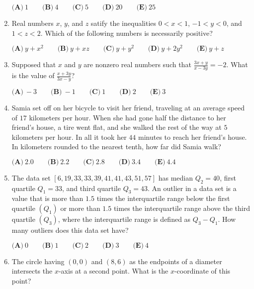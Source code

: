 \documentclass{article}
\begin{document}
\begin{enumerate}[label=\arabic*., itemsep=0.5em]
\(\textbf{(A)}\ 1\qquad\textbf{(B)}\ 4\qquad\textbf{(C)}\ 5\qquad\textbf{(D)}\ 20\qquad\textbf{(E)}\ 25\)\par \vspace{0.5em}\item Real numbers \(x\), \(y\), and \(z\) satify the inequalities
\(0<x<1\), \(-1<y<0\), and \(1<z<2\).
Which of the following numbers is necessarily positive?

\(\textbf{(A)}\ y+x^2\qquad\textbf{(B)}\ y+xz\qquad\textbf{(C)}\ y+y^2\qquad\textbf{(D)}\ y+2y^2\qquad\textbf{(E)}\ y+z\)\par \vspace{0.5em}\item Supposed that \(x\) and \(y\) are nonzero real numbers such that \(\frac{3x+y}{x-3y}=-2\). What is the value of \(\frac{x+3y}{3x-y}\)?

\(\textbf{(A)}\ -3\qquad\textbf{(B)}\ -1\qquad\textbf{(C)}\ 1\qquad\textbf{(D)}\ 2\qquad\textbf{(E)}\ 3\)\par \vspace{0.5em}\item Samia set off on her bicycle to visit her friend, traveling at an average speed of \(17\) kilometers per hour. When she had gone half the distance to her friend's house, a tire went flat, and she walked the rest of the way at \(5\) kilometers per hour. In all it took her \(44\) minutes to reach her friend's house. In kilometers rounded to the nearest tenth, how far did Samia walk?

\(\textbf{(A)}\ 2.0\qquad\textbf{(B)}\ 2.2\qquad\textbf{(C)}\ 2.8\qquad\textbf{(D)}\ 3.4\qquad\textbf{(E)}\ 4.4\)\par \vspace{0.5em}\item The data set \([6,19,33,33,39,41,41,43,51,57]\) has median \(Q_2 = 40\), first quartile \(Q_1 = 33\), and third quartile \(Q_3=43\). An outlier in a data set is a value that is more than \(1.5\) times the interquartile range below the first quartile \((Q_1)\) or more than \(1.5\) times the interquartile range above the third quartile \((Q_3)\), where the interquartile range is defined as \(Q_3 - Q_1\). How many outliers does this data set have?

\(\textbf{(A)}\ 0\qquad\textbf{(B)}\ 1\qquad\textbf{(C)}\ 2\qquad\textbf{(D)}\ 3\qquad\textbf{(E)}\ 4\)\par \vspace{0.5em}\item The circle having \((0,0)\) and \((8,6)\) as the endpoints of a diameter intersects the \(x\)-axis at a second point. What is the \(x\)-coordinate of this point? 


\end{enumerate}
\end{document}
